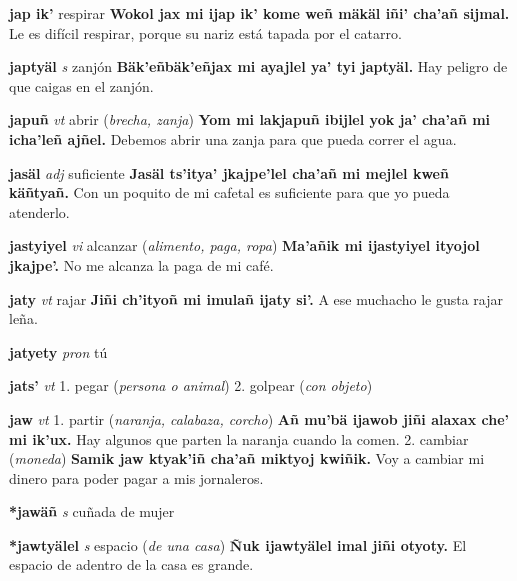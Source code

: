 \documentclass[10pt]{scrbook}
\newcommand{\entry}[1]{\textbf{#1}}
\newcommand{\onedefinition}[1]{#1.}
\newcommand{\partofspeech}[1]{\textit{#1}}
\newcommand{\spanishtranslation}[1]{#1}
\newcommand{\clarification}[1]{(\textit{#1})}
\newcommand{\cholexample}[1]{\textbf{#1}}
\newcommand{\exampletranslation}[1]{#1}
\begin{document}
\begin{multicols}{2}
\entry{jap ik'}
\spanishtranslation{respirar}
\cholexample{Wokol jax mi ijap ik' kome weñ mäkäl iñi' cha'añ sijmal.}
\exampletranslation{Le es difícil respirar, porque su nariz está tapada por el catarro.}

\entry{japtyäl}
\partofspeech{s}
\spanishtranslation{zanjón}
\cholexample{Bäk'eñbäk'eñjax mi ayajlel ya' tyi japtyäl.}
\exampletranslation{Hay peligro de que caigas en el zanjón.}

\entry{japuñ}
\partofspeech{vt}
\spanishtranslation{abrir}
\clarification{brecha, zanja}
\cholexample{Yom mi lakjapuñ ibijlel yok ja' cha'añ mi icha'leñ ajñel.}
\exampletranslation{Debemos abrir una zanja para que pueda correr el agua.}

\entry{jasäl}
\partofspeech{adj}
\spanishtranslation{suficiente}
\cholexample{Jasäl ts'itya' jkajpe'lel cha'añ mi mejlel kweñ käñtyañ.}
\exampletranslation{Con un poquito de mi cafetal es suficiente para que yo pueda atenderlo.}

\entry{jastyiyel}
\partofspeech{vi}
\spanishtranslation{alcanzar}
\clarification{alimento, paga, ropa}
\cholexample{Ma'añik mi ijastyiyel ityojol jkajpe'.}
\exampletranslation{No me alcanza la paga de mi café.}

\entry{jaty}
\partofspeech{vt}
\spanishtranslation{rajar}
\cholexample{Jiñi ch'ityoñ mi imulañ ijaty si'.}
\exampletranslation{A ese muchacho le gusta rajar leña.}

\entry{jatyety}
\partofspeech{pron}
\spanishtranslation{tú}

\entry{jats'}
\partofspeech{vt}
\onedefinition{1}
\spanishtranslation{pegar}
\clarification{persona o animal}
\onedefinition{2}
\spanishtranslation{golpear}
\clarification{con objeto}

\entry{jaw}
\partofspeech{vt}
\onedefinition{1}
\spanishtranslation{partir}
\clarification{naranja, calabaza, corcho}
\cholexample{Añ mu'bä ijawob jiñi alaxax che' mi ik'ux.}
\exampletranslation{Hay algunos que parten la naranja cuando la comen.}
\onedefinition{2}
\spanishtranslation{cambiar}
\clarification{moneda}
\cholexample{Samik jaw ktyak'iñ cha'añ miktyoj kwiñik.}
\exampletranslation{Voy a cambiar mi dinero para poder pagar a mis jornaleros.}

\entry{*jawäñ}
\partofspeech{s}
\spanishtranslation{cuñada de mujer}

\entry{*jawtyälel}
\partofspeech{s}
\spanishtranslation{espacio}
\clarification{de una casa}
\cholexample{Ñuk ijawtyälel imal jiñi otyoty.}
\exampletranslation{El espacio de adentro de la casa es grande.}


\end{multicols}
\end{document}
